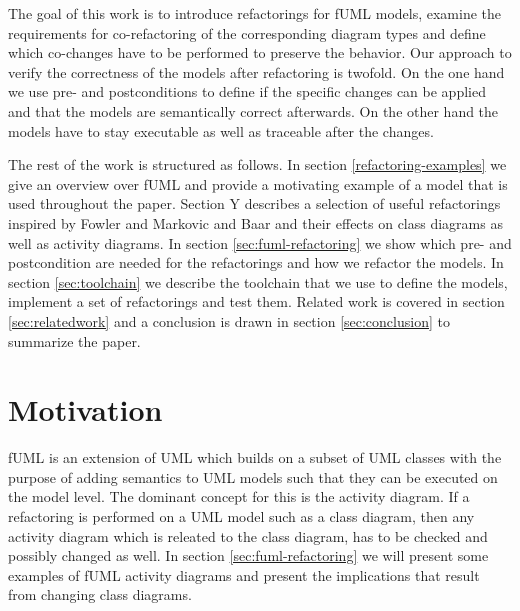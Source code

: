 \documentclass{llncs}
\begin{document}

The goal of this work is to introduce refactorings for fUML models, examine the requirements for co-refactoring of the
corresponding diagram types and define which co-changes have to be performed to preserve the behavior. Our approach to
verify
the correctness of the models after refactoring is twofold. On the one hand we use pre- and postconditions
\cite{rob99} to define if the specific changes can be applied and that the models are semantically correct afterwards.
On the other hand the models have to stay executable as well as traceable after the changes.



The rest of the work is structured as follows. In section \ref{refactoring-examples} we give an overview over fUML and provide
a motivating
example of a model that is used throughout the paper. Section Y describes a selection of useful refactorings inspired by
Fowler \cite{fow99} and Markovic and Baar \cite{DBLP:journals/sosym/MarkovicB08} and their effects on class diagrams as
well as activity diagrams. In section \ref{sec:fuml-refactoring} we show which pre- and postcondition are needed for the refactorings and
how we refactor the models. In section \ref{sec:toolchain} we describe the toolchain that we use to define the models, 
implement a set of refactorings and test them. Related work is covered in section \ref{sec:relatedwork} and a conclusion is drawn in section \ref{sec:conclusion} to summarize the paper.



\section{Motivation}
fUML is an extension of UML which builds on a subset of UML classes with the purpose of adding semantics to UML models 
such that they can be executed on the model level. The dominant concept for this is the activity diagram. If a refactoring 
is performed on a UML model such as a class diagram, then any activity diagram which is releated to the class diagram, has 
to be checked and possibly changed as well. In section \ref{sec:fuml-refactoring} we will present some examples of fUML 
activity diagrams and present the implications  that result from changing class 
diagrams.
\end{document}
